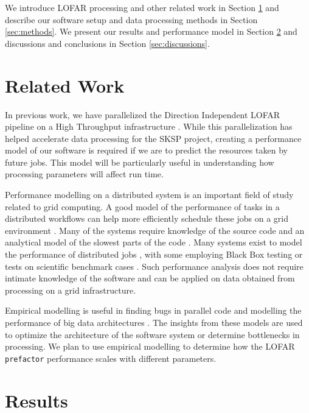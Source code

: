\documentclass[preprint,5p]{elsarticle}
\begin{document}
We introduce LOFAR processing and other related work in Section \ref{sec:related} and describe our software setup and data processing methods in Section \ref{sec:methods}. We present our results and performance model in Section \ref{sec:results} and  discussions and conclusions in Section \ref{sec:discussions}. 


\section{Related Work}\label{sec:related}
In previous work, we have parallelized the Direction Independent LOFAR pipeline on a High Throughput infrastructure \citep{mechev17}. While this parallelization has helped accelerate data processing for the SKSP project, creating a performance model of our software is required if we are to predict the resources taken by future jobs. This model will be particularly useful in understanding how processing parameters will affect run time.  

Performance modelling on a distributed system is an important field of study related to grid computing. A good model of the performance of tasks in a distributed workflows can help more efficiently schedule these jobs on a grid environment \citep{grid_perform_model}. Many of the systems require knowledge of the source code and an analytical model of the slowest parts of the code \citep{semi_analytical_model}. Many systems exist to model the performance of distributed jobs \citep{barnes2008regression, semi_analytical_model,performance_prediction,Witt2018PredictivePM}, with some employing Black Box testing \citep{cross_platform_black_box, mapreduce_analysis} or tests on scientific benchmark cases \citep{synthetic_memory_prediction}. Such performance analysis does not require intimate knowledge of the software and can be applied on data obtained from processing on a grid infrastructure.

Empirical modelling is useful in finding bugs in parallel code \citep{scalability_bugs} and modelling the performance of big data architectures \citep{mean_field_modeling}. The insights from these models are used to optimize the architecture of the software system or determine bottlenecks in processing. We plan to use empirical modelling to determine how the LOFAR \texttt{prefactor} performance scales with different parameters. 




\section{Results}\label{sec:results}
\end{document}
